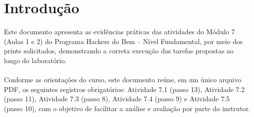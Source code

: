 \section{Introdução}

\paragraph{}
Este documento apresenta as evidências práticas das atividades do Módulo 7
(Aulas 1 e 2) do Programa Hackers do Bem -- Nível Fundamental, por meio dos
prints solicitados, demonstrando a correta execução das tarefas propostas ao
longo do laboratório.

\paragraph{}
Conforme as orientações do curso, este documento reúne, em um único arquivo
PDF, os seguintes registros obrigatórios: Atividade 7.1 (passo 13), Atividade
7.2 (passo 11), Atividade 7.3 (passo 8), Atividade 7.4 (passo 9) e Atividade
7.5 (passo 10), com o objetivo de facilitar a análise e avaliação por parte do
instrutor.
